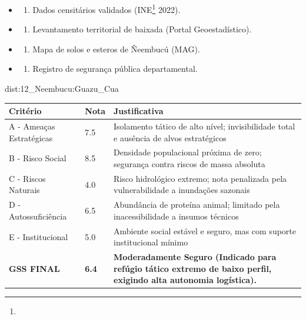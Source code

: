 {\begin{itemize}
\tightlist
\item
  \begin{enumerate}
  \def\labelenumi{\arabic{enumi})}
  \tightlist
  \item
    Dados censitários validados (INE\footnote{\fineINE} 2022).
  \end{enumerate}
\item
  \begin{enumerate}
  \def\labelenumi{\arabic{enumi})}
  \setcounter{enumi}{1}
  \tightlist
  \item
    Levantamento territorial de baixada (Portal Geoestadístico).
  \end{enumerate}
\item
  \begin{enumerate}
  \def\labelenumi{\arabic{enumi})}
  \setcounter{enumi}{2}
  \tightlist
  \item
    Mapa de solos e esteros de Ñeembucú (MAG).
  \end{enumerate}
\item
  \begin{enumerate}
  \def\labelenumi{\arabic{enumi})}
  \setcounter{enumi}{3}
  \tightlist
  \item
    Registro de segurança pública departamental.
  \end{enumerate}
\end{itemize}}{dist:12_Neembucu:Guazu_Cua}
\begin{table}[ht!]
\small \begin{tabular}{p{3.0cm}p{0.8cm}p{6.0cm}} \toprule
\textbf{Critério} & \textbf{Nota} & \textbf{Justificativa} \\ \midrule
A - Ameaças Estratégicas & 7.5 & Isolamento tático de alto nível; invisibilidade total e ausência de alvos estratégicos \\
B - Risco Social & 8.5 & Densidade populacional próxima de zero; segurança contra riscos de massa absoluta \\
C - Riscos Naturais & 4.0 & Risco hidrológico extremo; nota penalizada pela vulnerabilidade a inundações sazonais \\
D - Autossuficiência & 6.5 & Abundância de proteína animal; limitado pela inacessibilidade a insumos técnicos \\
E - Institucional & 5.0 & Ambiente social estável e seguro, mas com suporte institucional mínimo \\
\midrule \textbf{GSS FINAL} & \textbf{6.4} & \textbf{Moderadamente Seguro (Indicado para refúgio tático extremo de baixo perfil, exigindo alta autonomia logística).} \\ \bottomrule \end{tabular}
\end{table}

